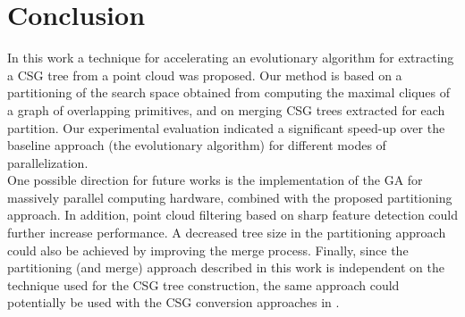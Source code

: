 \section{Conclusion}
\label{sec:conclusion}
In this work a technique for accelerating an evolutionary algorithm for extracting 
a \ac{CSG} tree from a point cloud was proposed. Our method is based on a partitioning of the search space obtained 
from computing the maximal cliques of a graph of overlapping primitives, and on merging \ac{CSG} trees 
extracted for each partition. 
Our experimental evaluation indicated a significant speed-up over the baseline approach (the evolutionary algorithm) for different modes of parallelization.
\\
One possible direction for future works is 
the implementation of the \ac{GA} for massively parallel computing hardware, combined with the proposed partitioning approach. 
In addition, point cloud filtering based on sharp feature detection \cite{weber2010sharp} could further increase performance.
A decreased tree size in the partitioning approach could also be achieved by improving the merge process.
Finally, since the partitioning (and merge) approach described in this work is independent on the technique used for the CSG tree construction, the same approach could potentially be used with the CSG conversion approaches in \cite{shapiro1991construction,buchele2004three}. 

